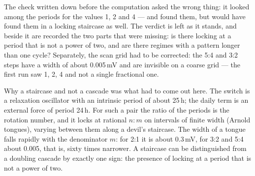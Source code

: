 \begin{note}
The check written down before the computation asked the wrong thing: it looked among the periods for the values 1, 2 and 4 --- and found them, but would have found them in a locking staircase as well. The verdict is left as it stands, and beside it are recorded the two parts that were missing: is there locking at a period that is not a power of two, and are there regimes with a pattern longer than one cycle? Separately, the scan grid had to be corrected: the 5:4 and 3:2 steps have a width of about 0.005\,mV and are invisible on a coarse grid --- the first run saw 1, 2, 4 and not a single fractional one.
\end{note}

\begin{ineq}
Why a staircase and not a cascade was what had to come out here. The switch is a relaxation oscillator with an intrinsic period of about 25\,h; the daily term is an external force of period 24\,h. For such a pair the ratio of the periods is the rotation number, and it locks at rational $n\!:\!m$ on intervals of finite width (Arnold tongues), varying between them along a devil's staircase. The width of a tongue falls rapidly with the denominator $m$: for 2:1 it is about 0.3\,mV, for 3:2 and 5:4 about 0.005, that is, sixty times narrower. A staircase can be distinguished from a doubling cascade by exactly one sign: the presence of locking at a period that is not a power of two.
\end{ineq}
